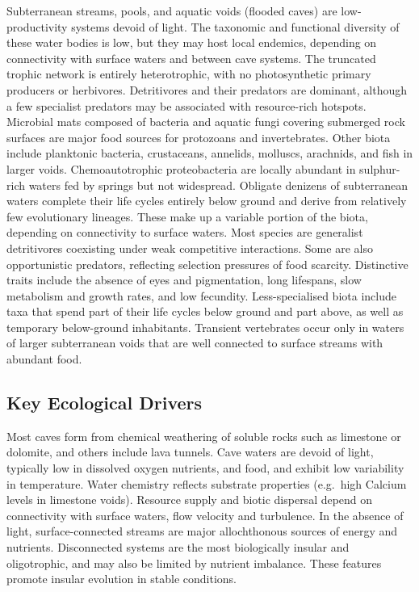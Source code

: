 \documentclass[
  letterpaper,
  DIV=11,
  numbers=noendperiod]{scrartcl}
\begin{document}
Subterranean streams, pools, and aquatic voids (flooded caves) are
low-productivity systems devoid of light. The taxonomic and functional
diversity of these water bodies is low, but they may host local
endemics, depending on connectivity with surface waters and between cave
systems. The truncated trophic network is entirely heterotrophic, with
no photosynthetic primary producers or herbivores. Detritivores and
their predators are dominant, although a few specialist predators may be
associated with resource-rich hotspots. Microbial mats composed of
bacteria and aquatic fungi covering submerged rock surfaces are major
food sources for protozoans and invertebrates. Other biota include
planktonic bacteria, crustaceans, annelids, molluscs, arachnids, and
fish in larger voids. Chemoautotrophic proteobacteria are locally
abundant in sulphur-rich waters fed by springs but not widespread.
Obligate denizens of subterranean waters complete their life cycles
entirely below ground and derive from relatively few evolutionary
lineages. These make up a variable portion of the biota, depending on
connectivity to surface waters. Most species are generalist detritivores
coexisting under weak competitive interactions. Some are also
opportunistic predators, reflecting selection pressures of food
scarcity. Distinctive traits include the absence of eyes and
pigmentation, long lifespans, slow metabolism and growth rates, and low
fecundity. Less-specialised biota include taxa that spend part of their
life cycles below ground and part above, as well as temporary
below-ground inhabitants. Transient vertebrates occur only in waters of
larger subterranean voids that are well connected to surface streams
with abundant food.

\subsection{Key Ecological Drivers}\label{key-ecological-drivers-62}

Most caves form from chemical weathering of soluble rocks such as
limestone or dolomite, and others include lava tunnels. Cave waters are
devoid of light, typically low in dissolved oxygen nutrients, and food,
and exhibit low variability in temperature. Water chemistry reflects
substrate properties (e.g.~high Calcium levels in limestone voids).
Resource supply and biotic dispersal depend on connectivity with surface
waters, flow velocity and turbulence. In the absence of light,
surface-connected streams are major allochthonous sources of energy and
nutrients. Disconnected systems are the most biologically insular and
oligotrophic, and may also be limited by nutrient imbalance. These
features promote insular evolution in stable conditions.
\end{document}
